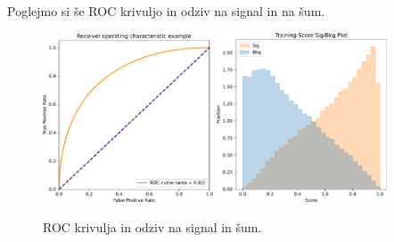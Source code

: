 Poglejmo si še ROC krivuljo in odziv na signal in na šum.
\begin{figure}
    \centering
    \includegraphics[width=0.45\textwidth]{../pdf/nn/roc-curve.pdf}
    \includegraphics[width=0.45\textwidth]{../pdf/nn/ml-score.pdf}
    \caption{ROC krivulja in odziv na signal in šum.\label{fig:nn-roc-score}}
\end{figure}

